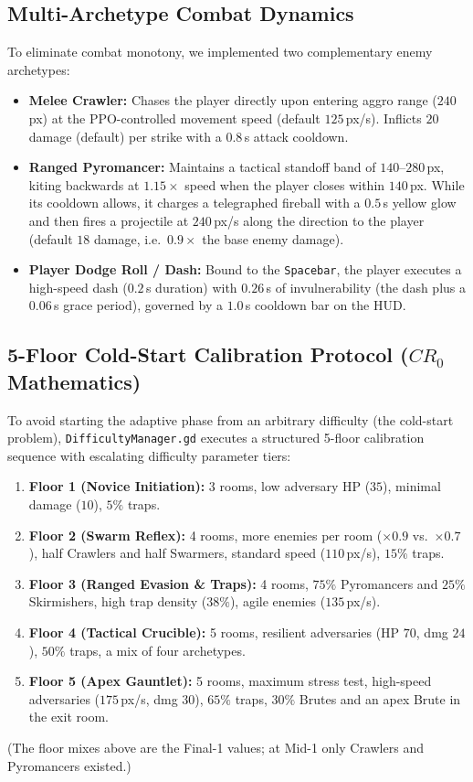 \subsection{Multi-Archetype Combat Dynamics}
To eliminate combat monotony, we implemented two complementary enemy archetypes:
\begin{itemize}
    \item \textbf{Melee Crawler:} Chases the player directly upon entering aggro range ($240$\,px) at the PPO-controlled movement speed (default $125$\,px/s). Inflicts $20$ damage (default) per strike with a $0.8$\,s attack cooldown.
    \item \textbf{Ranged Pyromancer:} Maintains a tactical standoff band of $140$--$280$\,px, kiting backwards at $1.15\times$ speed when the player closes within $140$\,px. While its cooldown allows, it charges a telegraphed fireball with a $0.5$\,s yellow glow and then fires a projectile at $240$\,px/s along the direction to the player (default $18$ damage, i.e.\ $0.9\times$ the base enemy damage).
    \item \textbf{Player Dodge Roll / Dash:} Bound to the \texttt{Spacebar}, the player executes a high-speed dash ($0.2$\,s duration) with $0.26$\,s of invulnerability (the dash plus a $0.06$\,s grace period), governed by a $1.0$\,s cooldown bar on the HUD.
\end{itemize}

\subsection{5-Floor Cold-Start Calibration Protocol ($CR_0$ Mathematics)}
To avoid starting the adaptive phase from an arbitrary difficulty (the cold-start problem), \texttt{DifficultyManager.gd} executes a structured 5-floor calibration sequence with escalating difficulty parameter tiers:
\begin{enumerate}
    \item \textbf{Floor 1 (Novice Initiation):} 3 rooms, low adversary HP ($35$), minimal damage ($10$), $5\%$ traps.
    \item \textbf{Floor 2 (Swarm Reflex):} 4 rooms, more enemies per room ($\times0.9$ vs.\ $\times0.7$), half Crawlers and half Swarmers, standard speed ($110$\,px/s), $15\%$ traps.
    \item \textbf{Floor 3 (Ranged Evasion \& Traps):} 4 rooms, $75\%$ Pyromancers and $25\%$ Skirmishers, high trap density ($38\%$), agile enemies ($135$\,px/s).
    \item \textbf{Floor 4 (Tactical Crucible):} 5 rooms, resilient adversaries (HP $70$, dmg $24$), $50\%$ traps, a mix of four archetypes.
    \item \textbf{Floor 5 (Apex Gauntlet):} 5 rooms, maximum stress test, high-speed adversaries ($175$\,px/s, dmg $30$), $65\%$ traps, $30\%$ Brutes and an apex Brute in the exit room.
\end{enumerate}
(The floor mixes above are the Final-1 values; at Mid-1 only Crawlers and Pyromancers existed.)

